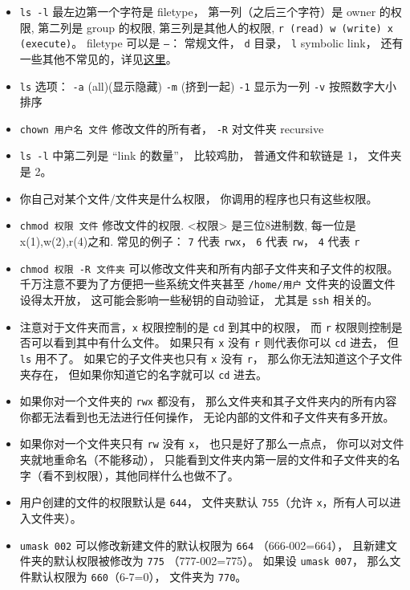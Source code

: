 \begin{itemize}
\item \verb`ls -l` 最左边第一个字符是 filetype， 第一列（之后三个字符）是 owner 的权限, 第二列是 group 的权限, 第三列是其他人的权限, \verb`r (read) w (write) x (execute)`。 filetype 可以是 \verb|–|： 常规文件， \verb|d| 目录， \verb|l| symbolic link， 还有一些其他不常见的，详见\href{https://linuxconfig.org/identifying-file-types-in-linux}{这里}。
\item \verb`ls` 选项： \verb`-a` (all)(显示隐藏) \verb`-m` (挤到一起) \verb`-1` 显示为一列 \verb`-v` 按照数字大小排序
\item \verb`chown 用户名 文件` 修改文件的所有者， \verb|-R| 对文件夹 recursive
\item \verb|ls -l| 中第二列是 “link 的数量”， 比较鸡肋， 普通文件和软链是 1， 文件夹是 2。
\item 你自己对某个文件/文件夹是什么权限， 你调用的程序也只有这些权限。
\item \verb`chmod 权限 文件` 修改文件的权限. <权限> 是三位8进制数, 每一位是 x(1),w(2),r(4)之和. 常见的例子： \verb|7| 代表 \verb|rwx|， \verb|6| 代表 \verb|rw|， \verb|4| 代表 \verb|r|
\item \verb`chmod 权限 -R 文件夹` 可以修改文件夹和所有内部子文件夹和子文件的权限。 千万注意不要为了方便把一些系统文件夹甚至 \verb|/home/用户| 文件夹的设置文件设得太开放， 这可能会影响一些秘钥的自动验证， 尤其是 \verb|ssh| 相关的。
\item 注意对于文件夹而言，\verb|x| 权限控制的是 \verb|cd| 到其中的权限， 而 \verb|r| 权限则控制是否可以看到其中有什么文件。 如果只有 \verb|x| 没有 \verb|r| 则代表你可以 \verb|cd| 进去， 但 \verb|ls| 用不了。 如果它的子文件夹也只有 \verb|x| 没有 \verb|r|， 那么你无法知道这个子文件夹存在， 但如果你知道它的名字就可以 \verb|cd| 进去。
\item 如果你对一个文件夹的 \verb|rwx| 都没有， 那么文件夹和其子文件夹内的所有内容你都无法看到也无法进行任何操作， 无论内部的文件和子文件夹有多开放。
\item 如果你对一个文件夹只有 \verb|rw| 没有 \verb|x|， 也只是好了那么一点点， 你可以对文件夹就地重命名（不能移动）， 只能看到文件夹内第一层的文件和子文件夹的名字（看不到权限），其他同样什么也做不了。
\item 用户创建的文件的权限默认是 \verb|644|， 文件夹默认 \verb|755|（允许 \verb|x|，所有人可以进入文件夹）。
\item \verb|umask 002| 可以修改新建文件的默认权限为 \verb|664| （666-002=664）， 且新建文件夹的默认权限被修改为 \verb|775| （777-002=775）。 如果设 \verb|umask 007|， 那么文件默认权限为 \verb|660|（6-7=0）， 文件夹为 \verb|770|。

\end{itemize}

